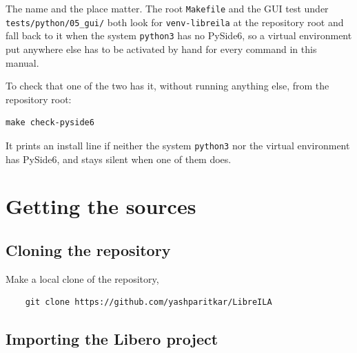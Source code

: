 \documentclass[../manual.tex]{subfiles}
\begin{document}
The name and the place matter. The root \texttt{Makefile} and the GUI test under \texttt{tests/python/05\_gui/} both look for \texttt{venv-libreila} at the repository root and fall back to it when the system \texttt{python3} has no PySide6, so a virtual environment put anywhere else has to be activated by hand for every command in this manual.

To check that one of the two has it, without running anything else, from the repository root:

\begin{lstlisting}
make check-pyside6
\end{lstlisting}

It prints an install line if neither the system \texttt{python3} nor the virtual environment has PySide6, and stays silent when one of them does.

\section{Getting the sources}
\label{sec:started_sources}

\subsection{Cloning the repository}
Make a local clone of the repository, 

\begin{lstlisting}
    git clone https://github.com/yashparitkar/LibreILA
\end{lstlisting}

\subsection{Importing the Libero project}
\end{document}
